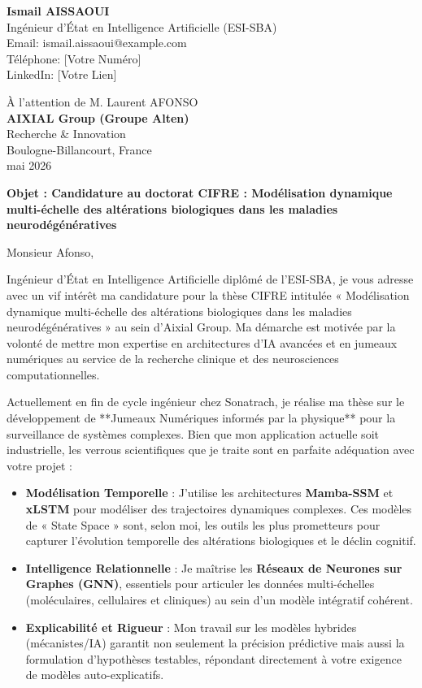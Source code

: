 \documentclass[11pt,a4paper]{article}
\begin{document}
\noindent \textbf{Ismail AISSAOUI} \\
Ingénieur d'État en Intelligence Artificielle (ESI-SBA) \\
Email: ismail.aissaoui@example.com \\
Téléphone: [Votre Numéro] \\
LinkedIn: [Votre Lien]

\bigskip

\begin{flushright}
    À l'attention de M. Laurent AFONSO \\
    \textbf{AIXIAL Group (Groupe Alten)} \\
    Recherche \& Innovation \\
    Boulogne-Billancourt, France \\
     mai 2026
\end{flushright}

\bigskip

\noindent \textbf{Objet : Candidature au doctorat CIFRE : Modélisation dynamique multi-échelle des altérations biologiques dans les maladies neurodégénératives}

\bigskip

Monsieur Afonso,

Ingénieur d'État en Intelligence Artificielle diplômé de l'ESI-SBA, je vous adresse avec un vif intérêt ma candidature pour la thèse CIFRE intitulée « Modélisation dynamique multi-échelle des altérations biologiques dans les maladies neurodégénératives » au sein d'Aixial Group. Ma démarche est motivée par la volonté de mettre mon expertise en architectures d'IA avancées et en jumeaux numériques au service de la recherche clinique et des neurosciences computationnelles.

Actuellement en fin de cycle ingénieur chez Sonatrach, je réalise ma thèse sur le développement de **Jumeaux Numériques informés par la physique** pour la surveillance de systèmes complexes. Bien que mon application actuelle soit industrielle, les verrous scientifiques que je traite sont en parfaite adéquation avec votre projet :
\begin{itemize}
    \item \textbf{Modélisation Temporelle} : J'utilise les architectures \textbf{Mamba-SSM} et \textbf{xLSTM} pour modéliser des trajectoires dynamiques complexes. Ces modèles de « State Space » sont, selon moi, les outils les plus prometteurs pour capturer l'évolution temporelle des altérations biologiques et le déclin cognitif.
    \item \textbf{Intelligence Relationnelle} : Je maîtrise les \textbf{Réseaux de Neurones sur Graphes (GNN)}, essentiels pour articuler les données multi-échelles (moléculaires, cellulaires et cliniques) au sein d'un modèle intégratif cohérent.
    \item \textbf{Explicabilité et Rigueur} : Mon travail sur les modèles hybrides (mécanistes/IA) garantit non seulement la précision prédictive mais aussi la formulation d'hypothèses testables, répondant directement à votre exigence de modèles auto-explicatifs.
\end{itemize}
\end{document}
